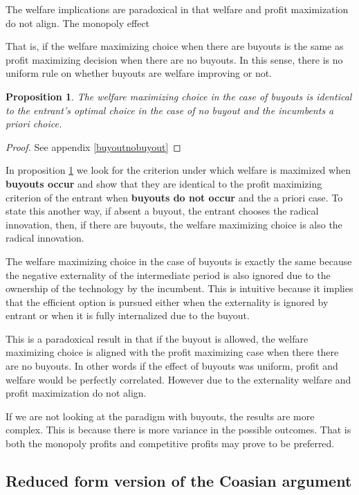 \documentclass[11pt]{article}
\newtheorem{proposition}{Proposition}
\begin{document}
The welfare implications are paradoxical in that welfare and profit maximization do not align. The monopoly effect

That is, if the welfare maximizing choice when there are buyouts is the same as profit maximizing decision when there are no buyouts. In this sense, there is no uniform rule on whether buyouts are welfare improving or not. 

\begin{proposition}\label{propwelfare}
The welfare maximizing choice in the case of buyouts is identical to the entrant's optimal choice in the case of no buyout and the incumbents a priori choice. 
\end{proposition}

\begin{proof}
See appendix \ref{buyoutnobuyout}
\end{proof}

In proposition \ref{propwelfare} we look for the criterion under which welfare is maximized when \textbf{ buyouts occur} and show that they are identical to the profit maximizing criterion of the entrant when \textbf{buyouts do not occur} and the a priori case. To state this another way, if absent a buyout, the entrant chooses the radical innovation, then, if there are buyouts, the welfare maximizing choice is also the radical innovation. 

The welfare maximizing choice in the case of buyouts is exactly the same because the negative externality of the intermediate period is also ignored due to the ownership of the technology by the incumbent. This is intuitive because it implies that the efficient option is pursued either when the externality is ignored by entrant or when it is fully internalized due to the buyout.

This is a paradoxical result in that if the buyout is allowed, the welfare maximizing choice is aligned with the profit maximizing case when there there are no buyouts. In other words if the effect of buyouts was uniform, profit and welfare would be perfectly correlated. However due to the externality welfare and profit maximization do not align. 

If we are not looking at the paradigm with buyouts, the results are more complex. This is because there is more variance in the possible outcomes. That is both the monopoly profits and competitive profits may prove to be preferred. 

\subsection*{Reduced form version of the Coasian argument}
\end{document}
